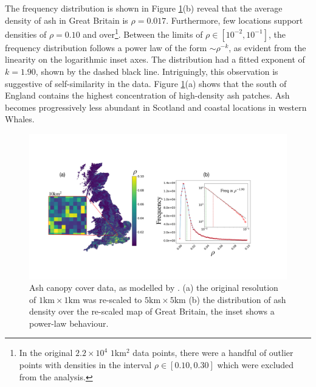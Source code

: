 The frequency distribution is shown in Figure \ref{fig:ash-host-data}(b) reveal that the average density of ash in Great Britain is $\rho=0.017$. Furthermore, few locations support densities of $\rho=0.10$ and over\footnote{In the original $2.2\times 10^4$ $1\mathrm{km^2}$ data points, there were a handful of outlier points with densities in the interval $\rho \in [0.10, 0.30]$ which were excluded from the analysis.}.  Between the limits of $\rho \in [10^{-2}, 10^{-1}]$, the frequency distribution follows a power law of the form $\sim \rho ^{-k}$, as evident from the linearity on the logarithmic inset axes. The distribution had a fitted exponent of $k=1.90$, shown by the dashed black line. Intriguingly, this observation is suggestive of self-similarity in the data. Figure \ref{fig:ash-host-data}(a) shows that the south of England contains the highest concentration of high-density ash patches. Ash becomes progressively less abundant in Scotland and coastal locations in western Whales.

% 

\begin{figure}
    \centering
    \includegraphics[scale=0.30]{chapter6/figures/fig3-ash-data.pdf}
    \caption{Ash canopy cover data, as modelled by \cite{hill.data}. (a) the original resolution of $1\mathrm{km} \times 1\mathrm{km}$ was re-scaled to $5\mathrm{km} \times 5\mathrm{km}$ (b) the distribution of ash density over the re-scaled map of Great Britain, the inset shows a power-law behaviour.} %
    \label{fig:ash-host-data}
\end{figure}


